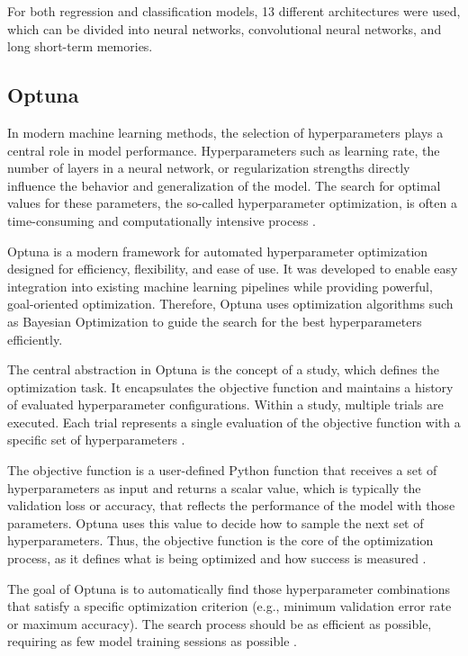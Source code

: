 For both regression and classification models, 13 different architectures were used, which can be divided into neural networks, convolutional neural networks, and long short-term memories.

\subsection{Optuna}

In modern machine learning methods, the selection of hyperparameters plays a central role in model performance.
Hyperparameters such as learning rate, the number of layers in a neural network, or regularization strengths directly influence the behavior and generalization of the model.
The search for optimal values for these parameters, the so-called hyperparameter optimization, is often a time-consuming and computationally intensive process \cite{hyperparameter-importance}.

Optuna is a modern framework for automated hyperparameter optimization designed for efficiency, flexibility, and ease of use.
It was developed to enable easy integration into existing machine learning pipelines while providing powerful, goal-oriented optimization.
Therefore, Optuna uses optimization algorithms such as Bayesian Optimization to guide the search for the best hyperparameters efficiently.


The central abstraction in Optuna is the concept of a study, which defines the optimization task.
It encapsulates the objective function and maintains a history of evaluated hyperparameter configurations.
Within a study, multiple trials are executed.
Each trial represents a single evaluation of the objective function with a specific set of hyperparameters \cite{optuna-basics}.

The objective function is a user-defined Python function that receives a set of hyperparameters as input and returns a scalar value, which is typically the validation loss or accuracy, that reflects the performance of the model with those parameters.
Optuna uses this value to decide how to sample the next set of hyperparameters.
Thus, the objective function is the core of the optimization process, as it defines what is being optimized and how success is measured \cite{optuna-basics}.

The goal of Optuna is to automatically find those hyperparameter combinations that satisfy a specific optimization criterion (e.g., minimum validation error rate or maximum accuracy).
The search process should be as efficient as possible, requiring as few model training sessions as possible \cite{optuna-hyperparameters}.

